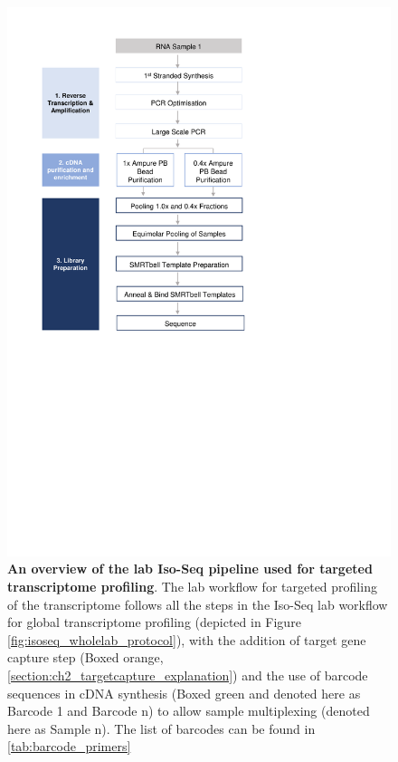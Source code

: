 \begin{figure}[]
	\begin{center}
		\includegraphics[page=2,trim={1cm 12cm 1cm 1cm},clip,scale = 0.8]{Figures/ProjectDevelopment_Figures.pdf}
	\end{center}
	\captionsetup{width=0.95\textwidth}
	\caption[Iso-Seq Lab workflow used for targeted profiling of the transcriptome]%
	{\textbf{An overview of the lab Iso-Seq pipeline used for targeted transcriptome profiling}. The lab workflow for targeted profiling of the transcriptome follows all the steps in the Iso-Seq lab workflow for global transcriptome profiling (depicted in Figure \ref{fig:isoseq_wholelab_protocol}), with the addition of target gene capture step (Boxed orange, \cref{section:ch2_targetcapture_explanation}) and the use of barcode sequences in cDNA synthesis (Boxed green and denoted here as Barcode 1 and Barcode n) to allow sample multiplexing (denoted here as Sample n). The list of barcodes can be found in \cref{tab:barcode_primers}}
	\label{fig:isoseq_targetedlab_protocol}
\end{figure}


